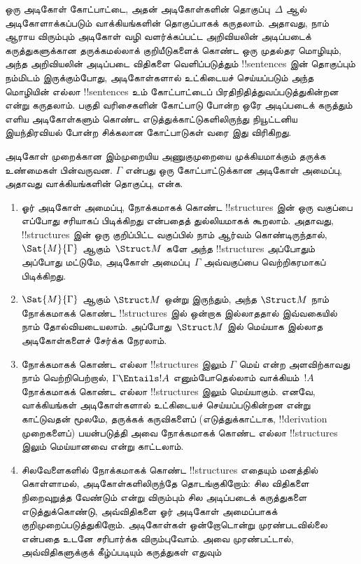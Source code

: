 \documentclass[../../../include/open-logic-section]{subfiles}
\begin{document}
\begin{explain}
ஒரு அடிகோள் கோட்பாட்டை, அதன் அடிகோள்களின் தொகுப்பு~$\Delta$ ஆல்
அடிகோளாக்கப்படும் வாக்கியங்களின் தொகுப்பாகக் கருதலாம். அதாவது, நாம்
ஆராய விரும்பும் அடிகோள் வழி வளர்க்கப்பட்ட அறிவியலின் அடிப்படைக்
கருத்துகளுக்கான தருக்கமல்லாக் குறியீடுகளைக் கொண்ட ஒரு முதல்தர மொழியும்,
அந்த அறிவியலின் அடிப்படை விதிகளை வெளிப்படுத்தும் !!{sentence}s இன்
தொகுப்பும் நம்மிடம் இருக்கும்போது, அடிகோள்களால் உட்கிடையச் செய்யப்படும்
அந்த மொழியின் எல்லா !!{sentence}s உம் கோட்பாட்டைப் பிரதிநிதித்துவப்படுத்துகின்றன
என்று கருதலாம். பகுதி வரிசைகளின் கோட்பாடு போன்ற ஒரே அடிப்படைக் கருத்தும்
எளிய அடிகோள்களும் கொண்ட எடுத்துக்காட்டுகளிலிருந்து நியூட்டனிய இயந்திரவியல்
போன்ற சிக்கலான கோட்பாடுகள் வரை இது விரிகிறது.

அடிகோள் முறைக்கான இம்முறையிய அணுகுமுறையை முக்கியமாக்கும் தருக்க
உண்மைகள் பின்வருவன. $\Gamma$ என்பது ஒரு கோட்பாட்டுக்கான அடிகோள்
அமைப்பு, அதாவது வாக்கியங்களின் தொகுப்பு, என்க.
\begin{enumerate}
\item ஓர் அடிகோள் அமைப்பு, நோக்கமாகக் கொண்ட !!{structure}s இன் ஒரு
  வகுப்பை எப்போது சரியாகப் பிடிக்கிறது என்பதைத் துல்லியமாகக் கூறலாம்.
  அதாவது, !!{structure}s இன் ஒரு குறிப்பிட்ட வகுப்பில் நாம் ஆர்வம்
  கொண்டிருந்தால், $\Sat{M}{\Gamma}$ ஆகும்~$\Struct M$ களே அந்த
  !!{structure}s அப்போதும் அப்போது மட்டுமே, அடிகோள் அமைப்பு~$\Gamma$ அவ்வகுப்பை வெற்றிகரமாகப்
  பிடிக்கிறது.
\item $\Sat{M}{\Gamma}$ ஆகும் $\Struct M$ ஒன்று இருந்தும், அந்த
  $\Struct M$ நாம் நோக்கமாகக் கொண்ட !!{structure}s இல் ஒன்றாக இல்லாததால்
  இவ்வகையில் நாம்
  தோல்வியடையலாம். அப்போது~$\Struct M$ இல் மெய்யாக இல்லாத அடிகோள்களைச்
  சேர்க்க நேரலாம்.
\item நோக்கமாகக் கொண்ட எல்லா !!{structure}s இலும் $\Gamma$ மெய் என்ற
  அளவிற்காவது நாம் வெற்றிபெற்றால், $\Gamma \Entails !A$ எனும்போதெல்லாம்
  வாக்கியம்~$!A$ நோக்கமாகக் கொண்ட எல்லா !!{structure}s இலும் மெய்யாகும்.
  எனவே, வாக்கியங்கள் அடிகோள்களால் உட்கிடையச் செய்யப்படுகின்றன என்று
  காட்டுவதன் மூலமே, தருக்கக் கருவிகளைப் (எடுத்துக்காட்டாக,
  !!{derivation} முறைகளைப்) பயன்படுத்தி அவை நோக்கமாகக் கொண்ட எல்லா
  !!{structure}s இலும் மெய்யானவை என்று காட்டலாம்.
\item சிலவேளைகளில் நோக்கமாகக் கொண்ட !!{structure}s எதையும் மனத்தில்
  கொள்ளாமல், அடிகோள்களிலிருந்தே தொடங்குகிறோம்: சில விதிகளை
  நிறைவுறுத்த வேண்டும் என்று விரும்பும் சில அடிப்படைக் கருத்துகளை
  எடுத்துக்கொண்டு, அவ்விதிகளை ஓர் அடிகோள் அமைப்பாகக் குறிமுறைப்படுத்துகிறோம்.
  அடிகோள்கள் ஒன்றோடொன்று முரண்படவில்லை என்பதை உடனே சரிபார்க்க விரும்புவோம்.
  அவை முரண்பட்டால், அவ்விதிகளுக்குக் கீழ்ப்படியும் கருத்துகள் எதுவும்

\end{enumerate}
\end{explain}
\end{document}

